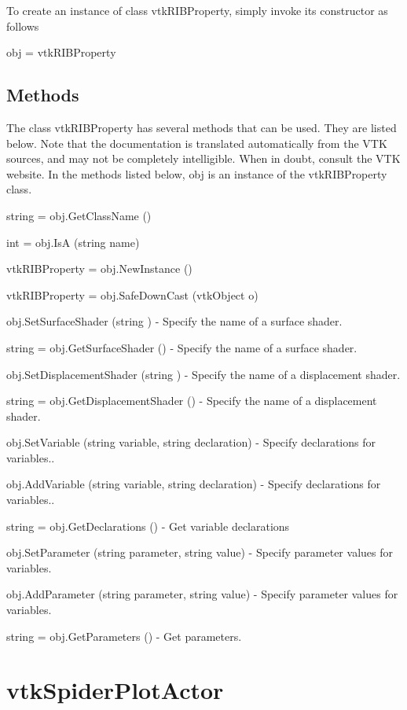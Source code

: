 To create an instance of class vtk\-R\-I\-B\-Property, simply invoke its constructor as follows \begin{DoxyVerb}  obj = vtkRIBProperty
\end{DoxyVerb}
 \hypertarget{vtkwidgets_vtkxyplotwidget_Methods}{}\subsection{Methods}\label{vtkwidgets_vtkxyplotwidget_Methods}
The class vtk\-R\-I\-B\-Property has several methods that can be used. They are listed below. Note that the documentation is translated automatically from the V\-T\-K sources, and may not be completely intelligible. When in doubt, consult the V\-T\-K website. In the methods listed below, {\ttfamily obj} is an instance of the vtk\-R\-I\-B\-Property class. 
\begin{DoxyItemize}
\item {\ttfamily string = obj.\-Get\-Class\-Name ()}  
\item {\ttfamily int = obj.\-Is\-A (string name)}  
\item {\ttfamily vtk\-R\-I\-B\-Property = obj.\-New\-Instance ()}  
\item {\ttfamily vtk\-R\-I\-B\-Property = obj.\-Safe\-Down\-Cast (vtk\-Object o)}  
\item {\ttfamily obj.\-Set\-Surface\-Shader (string )} -\/ Specify the name of a surface shader.  
\item {\ttfamily string = obj.\-Get\-Surface\-Shader ()} -\/ Specify the name of a surface shader.  
\item {\ttfamily obj.\-Set\-Displacement\-Shader (string )} -\/ Specify the name of a displacement shader.  
\item {\ttfamily string = obj.\-Get\-Displacement\-Shader ()} -\/ Specify the name of a displacement shader.  
\item {\ttfamily obj.\-Set\-Variable (string variable, string declaration)} -\/ Specify declarations for variables..  
\item {\ttfamily obj.\-Add\-Variable (string variable, string declaration)} -\/ Specify declarations for variables..  
\item {\ttfamily string = obj.\-Get\-Declarations ()} -\/ Get variable declarations  
\item {\ttfamily obj.\-Set\-Parameter (string parameter, string value)} -\/ Specify parameter values for variables.  
\item {\ttfamily obj.\-Add\-Parameter (string parameter, string value)} -\/ Specify parameter values for variables.  
\item {\ttfamily string = obj.\-Get\-Parameters ()} -\/ Get parameters.  
\end{DoxyItemize}\hypertarget{vtkhybrid_vtkspiderplotactor}{}\section{vtk\-Spider\-Plot\-Actor}\label{vtkhybrid_vtkspiderplotactor}
